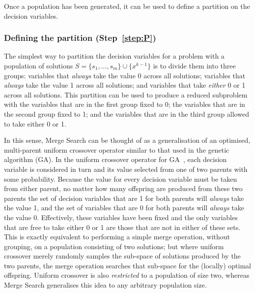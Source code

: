 \documentclass[journal]{IEEEtran}
\begin{document}
Once a population has been generated, it can be used to define a partition on the decision variables.

\subsubsection*{Defining the partition (Step~\ref{step:P})}


The simplest way to partition the decision variables for a problem with a population of solutions $S = \{s_1,\dots,s_m\}\cup \{x^{k-1}\}$ is to divide them into three groups: variables that \emph{always} take the value 0 across all solutions; variables that \emph{always} take the value 1 across all solutions; and variables that take \emph{either} 0 or 1 across all solutions. This partition can be used to produce a reduced subproblem with the variables that are in the first group fixed to 0; the variables that are in the second group fixed to 1; and the variables that are in the third group allowed to take either 0 or 1.

In this sense, Merge Search can be thought of as a generalisation of an optimised, multi-parent uniform crossover operator similar to that used in the genetic algorithm (GA). In the uniform crossover operator for GA~\cite{Luke2009}, each decision variable is considered in turn and its value selected from one of two parents with some probability. Because the value for every decision variable must be taken from either parent, no matter how many offspring are produced from these two parents the set of decision variables that are 1 for both parents will \emph{always} take the value 1, and the set of variables that are 0 for both parents will \emph{always} take the value 0. Effectively, these variables have been fixed and the only variables that are free to take either 0 or 1 are those that are not in either of these sets. This is exactly equivalent to performing a simple merge operation, without grouping, on a population consisting of two solutions; but where uniform crossover merely randomly samples the sub-space of solutions produced by the two parents, the merge operation searches that sub-space for the (locally) optimal offspring. Uniform crossover is also \emph{restricted} to a population of size two, whereas Merge Search generalises this idea to any arbitrary population size.
\end{document}
